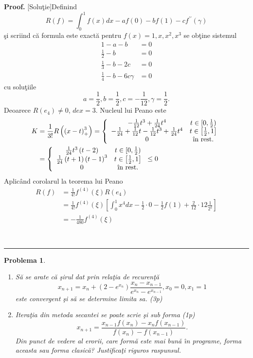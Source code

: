 \documentclass{article}%
\newtheorem{problem}[theorem]{Problema}
\newenvironment{proof}[1][Proof]{\noindent\textbf{#1.} }{\ \rule{0.5em}{0.5em}}
\begin{document}
\begin{proof}
[Solu\c{t}ie]Definind%
\[
R(f)=\int_{0}^{1}f(x)dx-af(0)-bf(1)-cf^{\prime\prime}(\gamma)
\]
\c{s}i scriind c\u{a} formula este exact\u{a} pentru $f(x)=1,x,x^{2},x^{3}$ se
ob\c{t}ine sistemul%
\begin{align*}
1-a-b  &  =0\\
\frac{1}{2}-b  &  =0\\
\frac{1}{3}-b-2c  &  =0\\
\frac{1}{4}-b-6c\gamma &  =0
\end{align*}
cu solu\c{t}iile%
\[
a=\frac{1}{2},b=\frac{1}{2},c=-\frac{1}{12},\gamma=\frac{1}{2}.
\]
Deoarece $R(e_{4})\neq0$, $dex=3$. Nucleul lui Peano este%
\begin{align*}
K  &  =\frac{1}{3!}R\left(  \left(  x-t\right)  _{+}^{3}\right)  =\left\{
\begin{array}
[c]{cc}%
-\frac{1}{12}t^{3}+\frac{1}{24}t^{4} & t\in\lbrack0,\frac{1}{2})\\
-\frac{1}{24}+\frac{1}{12}t-\frac{1}{12}t^{3}+\frac{1}{24}t^{4} & t\in\left[
\frac{1}{2},1\right] \\
0 & \text{\^{\i}n rest.}%
\end{array}
\right. \\
&  =\left\{
\begin{array}
[c]{cc}%
\frac{1}{24}t^{3}\left(  t-2\right)  & t\in\lbrack0,\frac{1}{2})\\
\frac{1}{24}\left(  t+1\right)  \left(  t-1\right)  ^{3} & t\in\left[
\frac{1}{2},1\right] \\
0 & \text{\^{\i}n rest.}%
\end{array}
\right.  \leq0
\end{align*}
Aplic\^{a}nd corolarul la teorema lui Peano%
\begin{align*}
R(f)  &  =\frac{1}{4!}f^{(4)}(\xi)R(e_{4})\\
&  =\frac{1}{4!}f^{(4)}(\xi)\left[  \int_{0}^{1}x^{4}dx-\frac{1}{2}%
\cdot0-\frac{1}{2}f(1)+\frac{2}{12}\cdot12\frac{1}{2^{2}}\right] \\
&  =-\frac{1}{480}f^{(4)}(\xi)
\end{align*}

\end{proof}

\begin{problem}
\label{p5.23}

\begin{enumerate}
\item[(a)] S\u{a} se arate c\u{a} \c{s}irul dat prin rela\c{t}ia de
recuren\c{t}\u{a}
\[
x_{n+1}=x_{n}+(2-e^{x_{n}})\frac{x_{n}-x_{n-1}}{e^{x_{n}}-e^{x_{n-1}}}%
,x_{0}=0,x_{1}=1
\]
este convergent \c{s}i s\u{a} se determine limita sa. (3p)

\item[(b)] Itera\c{t}ia din metoda secantei se poate scrie \c{s}i sub forma
(1p)%
\[
x_{n+1}=\frac{x_{n-1}f(x_{n})-x_{n}f(x_{n-1})}{f(x_{n})-f(x_{n-1})}.
\]
Din punct de vedere al erorii, care form\u{a} este mai bun\u{a} \^{\i}n
programe, forma aceasta sau forma clasic\u{a}? Justifica\c{t}i riguros raspunsul.
\end{enumerate}
\end{problem}
\end{document}
